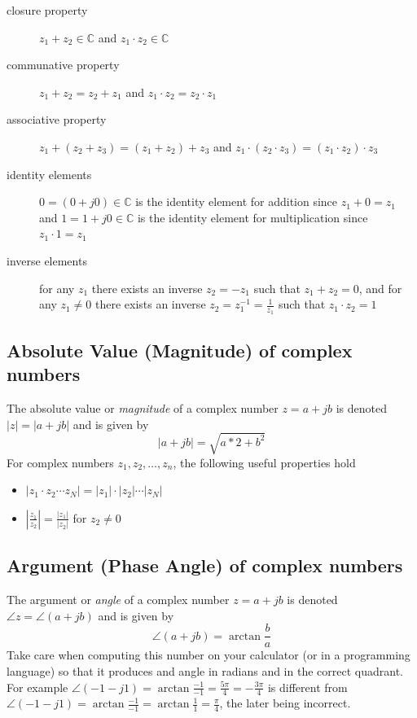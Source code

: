\begin{description}
\item[closure property] $z_1 + z_2 \in \mathbb{C}$ and  $z_1 \cdot z_2 \in \mathbb{C}$ 
\item[communative property] $z_1 + z_2 = z_2 + z_1$ and $z_1 \cdot z_2 = z_2 \cdot z_1$ 
\item[associative property] $z_1 + (z_2 + z_3) = (z_1 + z_2) + z_3$ and $z_1 \cdot (z_2 \cdot z_3) = (z_1 \cdot z_2) \cdot z_3$ 
\item[identity elements] $0 = (0 + j0) \in \mathbb{C}$ is the identity element for addition since $z_1 + 0 = z_1$ and $1 = 1 + j0 \in \mathbb{C}$ is the identity element for multiplication since $z_1\cdot 1 = z_1$ 
\item[inverse elements] for any $z_1$ there exists an inverse $z_2 = -z_1$ such that $z_1 + z_2 = 0$, and for any $z_1 \neq 0$ there exists an inverse $z_2 = z_1^{-1} = \tfrac{1}{z_1}$ such that $z_1 \cdot z_2 = 1$
\end{description}

\subsection*{Absolute Value (Magnitude) of complex numbers}

The absolute value or \textit{magnitude} of a complex number $z = a + jb$ is denoted $|z| = |a+jb|$ and is given by
\[
|a + jb| = \sqrt{a*2 + b^2}
\]
For complex numbers $z_1, z_2, \ldots, z_n$, the following useful properties hold
\begin{itemize}
\item $|z_1\cdot z_2 \cdots z_N| = |z_1|\cdot |z_2|\cdots|z_N|$
\item $\left| \frac{z_1}{z_2}\right| = \frac{|z_1|}{|z_2|}$ for $z_2 \neq 0$
\end{itemize}

\subsection*{Argument (Phase Angle) of complex numbers}
The argument or \textit{angle} of a complex number $z = a + jb$ is denoted $\angle z = \angle(a+jb)$ and is given by
\[
\angle(a + jb) = \arctan\frac{b}{a}
\]
Take care when computing this number on your calculator (or in a programming language) so that it produces and angle in radians and in the correct quadrant. For example $\angle(-1-j1) = \arctan\frac{-1}{-1} = \frac{5\pi}{4} = -\frac{3\pi}{4}$ is different from $\angle(-1-j1) = \arctan\frac{-1}{-1} = \arctan\frac{1}{1} = \frac{\pi}{4}$, the later being incorrect.

